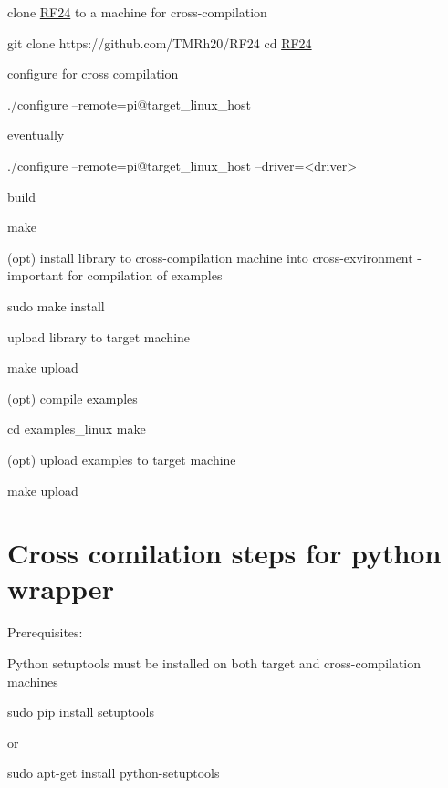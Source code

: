 \begin{DoxyEnumerate}
\item clone \hyperlink{classRF24}{R\+F24} to a machine for cross-\/compilation 
\begin{DoxyCode}
git clone https:\textcolor{comment}{//github.com/TMRh20/RF24}
cd \hyperlink{classRF24}{RF24}
\end{DoxyCode}

\item configure for cross compilation 
\begin{DoxyCode}
./configure --remote=pi@target\_linux\_host 
\end{DoxyCode}
 eventually 
\begin{DoxyCode}
./configure --remote=pi@target\_linux\_host --driver=<driver> 
\end{DoxyCode}

\item build 
\begin{DoxyCode}
make 
\end{DoxyCode}

\item (opt) install library to cross-\/compilation machine into cross-\/exvironment -\/ important for compilation of examples 
\begin{DoxyCode}
sudo make install 
\end{DoxyCode}

\item upload library to target machine 
\begin{DoxyCode}
make upload 
\end{DoxyCode}

\item (opt) compile examples 
\begin{DoxyCode}
cd examples\_linux
make
\end{DoxyCode}

\item (opt) upload examples to target machine 
\begin{DoxyCode}
make upload 
\end{DoxyCode}

\end{DoxyEnumerate}\hypertarget{CrossCompile_CxStepsPython}{}\section{Cross comilation steps for python wrapper}\label{CrossCompile_CxStepsPython}
Prerequisites\+:
\begin{DoxyItemize}
\item Python setuptools must be installed on both target and cross-\/compilation machines 
\begin{DoxyCode}
sudo pip install setuptools 
\end{DoxyCode}
 or 
\begin{DoxyCode}
sudo apt-\textcolor{keyword}{get} install python-setuptools 
\end{DoxyCode}

\end{DoxyItemize}


